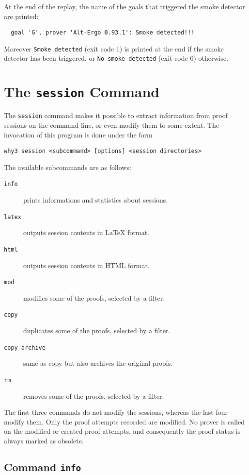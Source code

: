 At the end of the replay, the name of the goals that triggered the
smoke detector are printed:
\begin{verbatim}
  goal 'G', prover 'Alt-Ergo 0.93.1': Smoke detected!!!
\end{verbatim}
Moreover \texttt{Smoke detected} (exit code 1) is printed at the end
if the smoke detector has been triggered, or \texttt{No smoke
  detected} (exit code 0) otherwise.



\section{The \texttt{session} Command}
\label{sec:why3session}

The \texttt{session} command makes it possible to extract information from
proof sessions on the command line, or even modify them to some
extent. The invocation of this program is done under the form
\begin{verbatim}
why3 session <subcommand> [options] <session directories>
\end{verbatim}
The available subcommands are as follows:
\begin{description}
\item[\texttt{info}] prints informations and statistics about sessions.
\item[\texttt{latex}] outputs session contents in LaTeX format.
\item[\texttt{html}] outputs session contents in HTML format.
\item[\texttt{mod}] modifies some of the proofs, selected by a filter.
\item[\texttt{copy}] duplicates some of the proofs, selected by a filter.
\item[\texttt{copy-archive}] same as copy but also archives the
  original proofs.
\item[\texttt{rm}] removes some of the proofs, selected by a filter.
\end{description}

The first three commands do not modify the sessions, whereas the last
four modify them. Only the proof attempts recorded are modified. No
prover is called on the modified or created proof attempts, and
consequently the proof status is always marked as obsolete.

\subsection{Command \texttt{info}}

